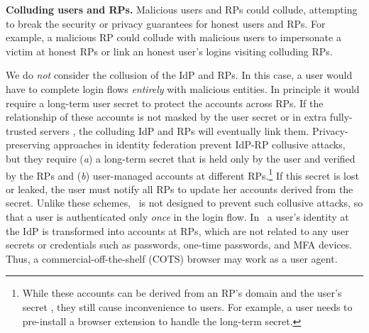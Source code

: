 \noindent \textbf{Colluding users and RPs.}
Malicious users and RPs could collude,
 attempting to break the security or privacy guarantees for honest users and RPs.
For example, a malicious RP could collude with malicious users to impersonate a victim at honest RPs or link an honest user's logins visiting colluding RPs.

We do \emph{not} consider the collusion of the IdP and RPs.
In this case, a user would have to complete login flows \emph{entirely} with malicious entities. 
In principle it would require a long-term user secret to protect the accounts across RPs.
If the relationship of these accounts is not masked by the user secret or in extra fully-trusted servers \cite{miso},
 the colluding IdP and RPs will eventually link them.
Privacy-preserving approaches in identity federation \cite{ELPASSO, UnlimitID, idemix, PseudoID, uprov} prevent IdP-RP collusive attacks,
but they require (\emph{a}) a long-term secret that is held only by the user and verified by the RPs and (\emph{b}) user-managed accounts at different RPs.\footnote{While these accounts can be derived from an RP's domain and the user's secret \cite{ELPASSO, UnlimitID, Opaak, uprov,idemix},
 they still cause inconvenience to users.
For example, a user needs to pre-install a browser extension to handle the long-term secret.}
If this secret is lost or leaked, the user must notify all RPs to update her accounts derived from the secret.
%
Unlike these schemes, \usso\ is not designed to prevent such collusive attacks,
 so that a user is authenticated only \emph{once} in the login flow.
In \usso\ a user's identity at the IdP is %
transformed into accounts at RPs,
which are not related to any user secrets or credentials such as passwords, one-time passwords, and MFA devices.
Thus, a commercial-off-the-shelf (COTS) browser may work as a user agent.


